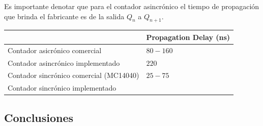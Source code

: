 Es importante denotar que para el contador asincr\'onico el tiempo de propagaci\'on que brinda el fabricante es de la salida $Q_n$ a $Q_{n+1}$. 
\begin{table}[H]
\centering
\begin{tabular}{ll}\hline
\multicolumn{1}{c}{}           & Propagation Delay (ns) \\ \hline
Contador asicr\'onico comercial     &            $80-160$  \\
Contador asincr\'onico implementado        &       $220$  \\
Contador sincr\'onico comercial (MC14040) &         $25-75$ \\
Contador sincr\'onico implementado   &               \\  \hline
\end{tabular}
\end{table}


\subsection{Conclusiones}

